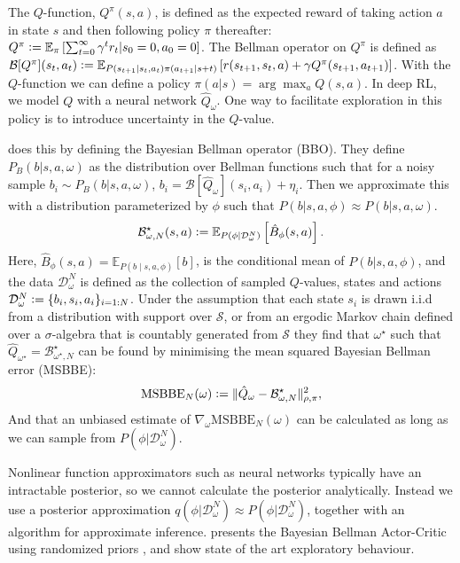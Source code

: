 \documentclass[]{uai2021} %
\newcommand{\defeq}{\vcentcolon=}
\newcommand{\E}{\mathbb{E}}
\newcommand{\D}{\mathcal{D}}
\newcommand{\B}{\mathcal{B}}
\newcommand{\state}{\mathcal{S}}
\begin{document}
The \(Q\)-function, \(Q^\pi(s,a)\), is defined as the expected reward of taking action
\(a\) in state \(s\) and then following policy \(\pi\) thereafter:
\(Q^\pi \defeq \E_\pi \left[ \sum_{t=0}^\infty \gamma^t r_t \vert s_0=0, a_0=0 \right]\).
The Bellman operator on \(Q^\pi\) is defined as
\(\B[Q^\pi](s_t,a_t) \defeq \E_{P(s_{t+1} \vert s_t, a_t)\pi(a_{t+1} \vert s+t)}
\left[ r(s_{t+1}, s_t, a) + \gamma Q^\pi(s_{t+1}, a_{t+1}) \right]\). With the
\(Q\)-function we can define a policy \(\pi(a \vert s) = \arg\max_a Q(s,a)\).
In deep RL, we model \(Q\) with a neural network \(\hat{Q}_\omega\).
One way to facilitate exploration in this policy is to introduce uncertainty in the
\(Q\)-value.

\cite{fellows_bayesian_2021} does this by defining the Bayesian Bellman
operator (BBO). They define \(P_B(b \vert s, a, \omega)\) as the distribution over
Bellman functions such that for a noisy sample \(b_i \sim P_B(b \vert s,a,\omega)\),
\(b_i = \B[\hat{Q}_\omega](s_i, a_i) + \eta_i\). Then we approximate this with a
distribution parameterized by \(\phi\) such that
\(P(b \vert s,a,\phi) \approx P(b \vert s,a,\omega)\).
\begin{equation}
    \B_{\omega, N}^\star(s,a) \defeq \E_{P(\phi \vert \D_\omega^N)} \left[ \hat{B}_\phi(s,a) \right].
\end{equation}
Here, \(\hat{B}_\phi(s,a) = \E_{P(b \mid s, a, \phi)}[b]\), is the conditional mean of
\(P(b \vert s, a, \phi)\), and the data \(\D_\omega^N\) is defined as the collection of
sampled \(Q\)-values, states and actions \(\D_\omega^N \defeq \{b_i, s_i, a_i\}_{i=1:N}\).
Under the assumption that each state \(s_i\) is drawn i.i.d from a distribution with
support over \(\state\), or from an ergodic Markov chain defined over a \(\sigma\)-algebra that is
countably generated from \(\state\) they find that \(\omega^\star\) such that
\(\hat{Q}_{\omega^\star} = \B^\star_{\omega^\star, N}\) can be found 
by minimising the mean squared Bayesian Bellman error (MSBBE):
\begin{equation}
    \mathrm{MSBBE}_N(\omega) \defeq \lVert \hat{Q}_{\omega} - \B^\star_{\omega, N} \lVert^2_{\rho, \pi},
\end{equation}
And that an unbiased estimate of \(\nabla_\omega \mathrm{MSBBE}_N(\omega)\) can be calculated
as long as we can sample from \(P(\phi \vert \D_\omega^N)\).

Nonlinear function approximators such as neural networks typically have an intractable
posterior, so we cannot calculate the posterior analytically. Instead we use a posterior approximation
\(q(\phi \vert \D_\omega^N) \approx P(\phi \vert \D_\omega^N)\), together with an algorithm
for approximate inference. \citet{fellows_bayesian_2021} presents the Bayesian Bellman Actor-Critic
using randomized priors \citep{osband_randomized_2018}, and show state of the art exploratory
behaviour.
\end{document}
